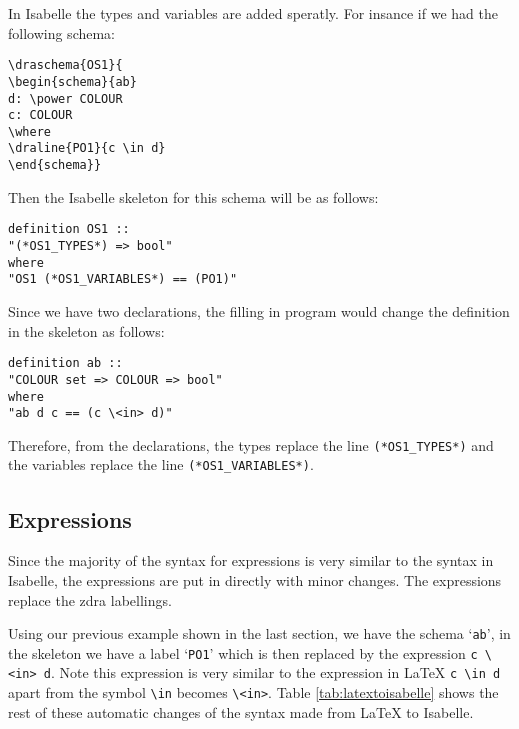 In Isabelle the types and variables are added speratly. For insance if we had
the following schema:

\begin{verbatim}
\draschema{OS1}{
\begin{schema}{ab}
d: \power COLOUR
c: COLOUR
\where
\draline{PO1}{c \in d}
\end{schema}}
\end{verbatim}

Then the Isabelle skeleton for this schema will be as follows:

\begin{verbatim}
definition OS1 ::
"(*OS1_TYPES*) => bool"
where
"OS1 (*OS1_VARIABLES*) == (PO1)"
\end{verbatim}

Since we have two declarations, the filling in program would change the
definition in the skeleton as follows:

\begin{verbatim}
definition ab ::
"COLOUR set => COLOUR => bool"
where
"ab d c == (c \<in> d)"
\end{verbatim}

Therefore, from the declarations, the types replace the line
\verb|(*OS1_TYPES*)| and the variables replace the line
\verb|(*OS1_VARIABLES*)|.

\subsection{Expressions}

Since the majority of the syntax for expressions is very similar to the syntax
in Isabelle, the expressions are put in directly with minor changes. The
expressions replace the \gls{zdra} labellings.

Using our previous example shown in the last section, we have the schema
`\texttt{ab}', in the skeleton we have a label `\texttt{PO1}' which is then
replaced by the expression \verb|c \<in> d|. Note this expression is very
similar to the expression in \LaTeX{} \verb|c \in d| apart from the symbol
\verb|\in| becomes \verb|\<in>|. Table \ref{tab:latextoisabelle} shows the rest
of these automatic changes of the syntax made from \LaTeX{} to Isabelle.

